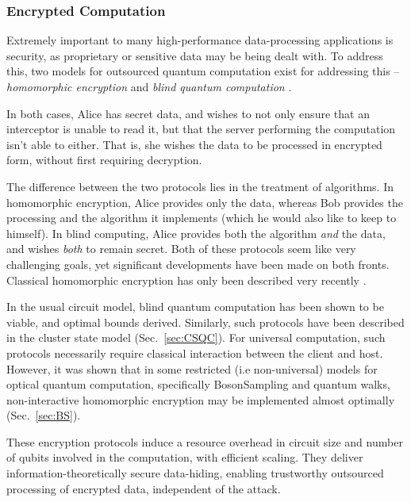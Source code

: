 \documentclass[aps,rmp,twocolumn,amsmath,amssymb,nofootinbib,superscriptaddress]{revtex4}
\begin{document}
%
%

\subsubsection{Encrypted Computation} \label{sec:homo_blind}

Extremely important to many high-performance data-processing applications is security, as proprietary or sensitive data may be being dealt with. To address this, two models for outsourced quantum computation exist for addressing this -- \emph{homomorphic encryption} \cite{???, gentry2009fully, van2010fully} and \emph{blind quantum computation} \cite{???, bib:blind2, bib:blind3, bib:blind1, PhysRevLett.108.200502, bib:Morimae3486, bib:Morimae5460, bib:Morimae3966}.

In both cases, Alice has secret data, and wishes to not only ensure that an interceptor is unable to read it, but that the server performing the computation isn't able to either. That is, she wishes the data to be processed in encrypted form, without first requiring decryption.

The difference between the two protocols lies in the treatment of algorithms. In homomorphic encryption, Alice provides only the data, whereas Bob provides the processing and the algorithm it implements (which he would also like to keep to himself). In blind computing, Alice provides both the algorithm \emph{and} the data, and wishes \emph{both} to remain secret. Both of these protocols seem like very challenging goals, yet significant developments have been made on both fronts. Classical homomorphic encryption has only been described very recently \cite{bib:gentry2009fully, bib:van2010fully}.

In the usual circuit model, blind quantum computation has been shown to be viable, and optimal bounds derived. Similarly, such protocols have been described \cite{homoCS} in the cluster state model (Sec.~\ref{sec:CSQC}). For universal computation, such protocols necessarily require classical interaction between the client and host. However, it was shown that in some restricted (i.e non-universal) models for optical quantum computation, specifically {\sc BosonSampling} and quantum walks, non-interactive homomorphic encryption may be implemented almost optimally (Sec.~\ref{sec:BS}).

These encryption protocols induce a resource overhead in circuit size and number of qubits involved in the computation, with efficient scaling. They deliver information-theoretically secure data-hiding, enabling trustworthy outsourced processing of encrypted data, independent of the attack.
\end{document}
